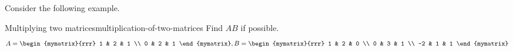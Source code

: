 Consider the following example.

\begin{example}{Multiplying two matrices}{multiplication-of-two-matrices}
  Find $AB$ if possible.
  \begin{equation*}
    A = \begin{mymatrix}{rrr}
      1 & 2 & 1 \\
      0 & 2 & 1
    \end{mymatrix}, B = \begin{mymatrix}{rrr}
      1 & 2 & 0 \\
      0 & 3 & 1 \\
      -2 & 1 & 1
    \end{mymatrix}
  \end{equation*}
\end{example}

